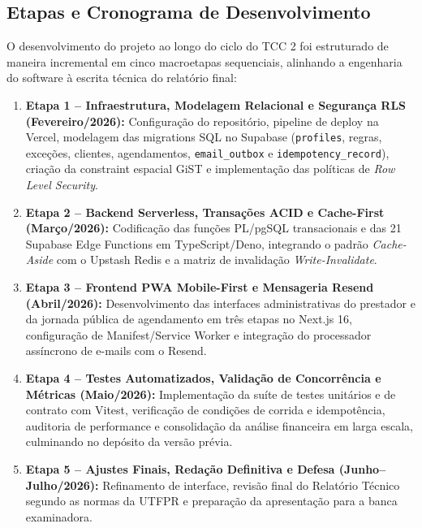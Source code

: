 \documentclass[12pt,a4paper]{article}
\begin{document}

\subsection{Etapas e Cronograma de Desenvolvimento}
\label{subsec:etapas_cronograma}

O desenvolvimento do projeto ao longo do ciclo do TCC 2 foi estruturado de maneira incremental em cinco macroetapas sequenciais, alinhando a engenharia do software à escrita técnica do relatório final:

\begin{enumerate}
    \item \textbf{Etapa 1 -- Infraestrutura, Modelagem Relacional e Segurança RLS (Fevereiro/2026):} Configuração do repositório, pipeline de deploy na Vercel, modelagem das migrations SQL no Supabase (\texttt{profiles}, regras, exceções, clientes, agendamentos, \texttt{email\_outbox} e \texttt{idempotency\_record}), criação da constraint espacial GiST e implementação das políticas de \textit{Row Level Security}.
    \item \textbf{Etapa 2 -- Backend Serverless, Transações ACID e Cache-First (Março/2026):} Codificação das funções PL/pgSQL transacionais e das 21 Supabase Edge Functions em TypeScript/Deno, integrando o padrão \textit{Cache-Aside} com o Upstash Redis e a matriz de invalidação \textit{Write-Invalidate}.
    \item \textbf{Etapa 3 -- Frontend PWA Mobile-First e Mensageria Resend (Abril/2026):} Desenvolvimento das interfaces administrativas do prestador e da jornada pública de agendamento em três etapas no Next.js 16, configuração de Manifest/Service Worker e integração do processador assíncrono de e-mails com o Resend.
    \item \textbf{Etapa 4 -- Testes Automatizados, Validação de Concorrência e Métricas (Maio/2026):} Implementação da suíte de testes unitários e de contrato com Vitest, verificação de condições de corrida e idempotência, auditoria de performance e consolidação da análise financeira em larga escala, culminando no depósito da versão prévia.
    \item \textbf{Etapa 5 -- Ajustes Finais, Redação Definitiva e Defesa (Junho--Julho/2026):} Refinamento de interface, revisão final do Relatório Técnico segundo as normas da UTFPR e preparação da apresentação para a banca examinadora.
\end{enumerate}
\end{document}
